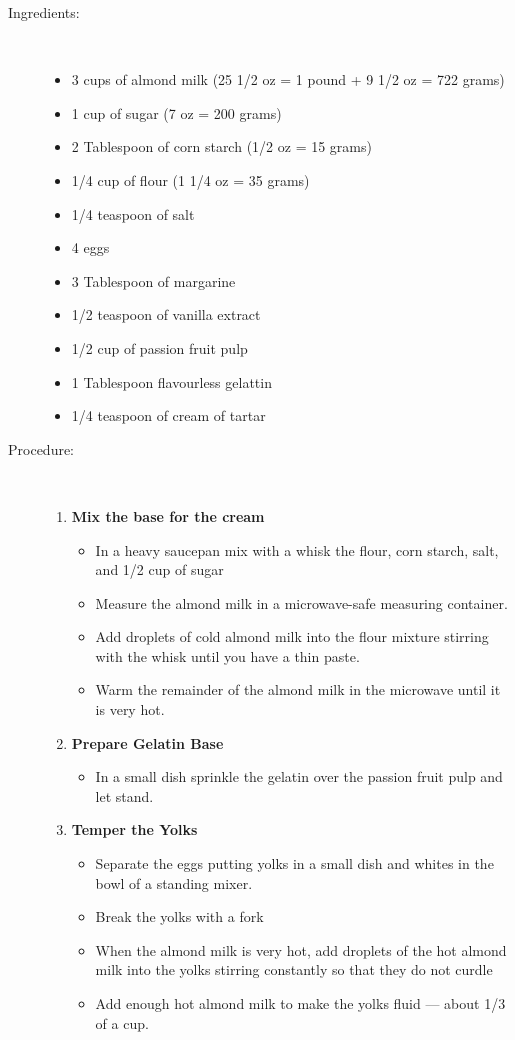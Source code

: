 \documentclass[11pt,letterpaper]{article}
\begin{document}
\vspace{0.3in}
\begin{description}

\item[Ingredients:]\ \\
	\begin{itemize}
	\item 3 cups of almond milk (25 1/2 oz = 1 pound + 9 1/2 oz = 722 grams)
	\item 1 cup of sugar (7 oz = 200 grams)
	\item 2 Tablespoon of corn starch (1/2 oz = 15 grams)
	\item 1/4 cup of flour (1 1/4 oz = 35 grams)
	\item 1/4 teaspoon of salt
	\item 4 eggs
	\item 3 Tablespoon of margarine
	\item 1/2 teaspoon of vanilla extract
	\item 1/2 cup of passion fruit pulp
	\item 1 Tablespoon flavourless gelattin
	\item 1/4 teaspoon of cream of tartar
	\end{itemize}

\item[Procedure:]\ \\
	\begin{enumerate}
	\item {\bf Mix the base for the cream}
	\begin{itemize}
	\item In a heavy saucepan mix with a whisk the flour, corn starch, salt, and 1/2 cup of sugar
	\item Measure the almond milk in a microwave-safe measuring container.
	\item Add droplets of cold almond milk into the flour mixture stirring with the whisk until you have a thin paste.
	\item Warm the remainder of the almond milk in the microwave until it is very hot.
	\end{itemize}
	
	\item {\bf Prepare Gelatin Base}
	\begin{itemize}
	\item In a small dish sprinkle the gelatin over the passion fruit pulp and let stand.
	\end{itemize}

	\item {\bf Temper the Yolks}
	\begin{itemize}
	\item Separate the eggs putting yolks in a small dish and whites in the bowl of a standing mixer.
	\item Break the yolks with a fork
	\item When the almond milk is very hot, add droplets of the hot almond milk into the yolks stirring constantly so that they do not curdle
	\item Add enough hot almond milk to make the yolks fluid --- about 1/3 of a cup.
	\end{itemize}


\end{enumerate}
\end{description}
\end{document}
